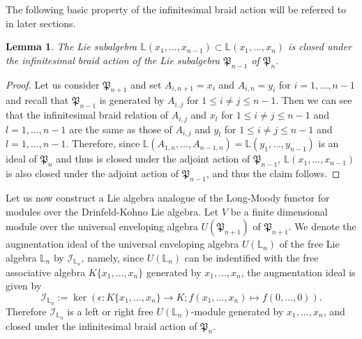 \documentclass[a4paper,12pt]{article}
\newtheorem{lem}[thm]{Lemma}
\theoremstyle{definition}
\theoremstyle{remark}
\begin{document}
The following basic property of the infinitesimal braid action will be referred to in later sections.
\begin{lem}\label{lem:minpurebraid}
	The Lie subalgebra $\mathbb{L}(x_{1},\ldots,x_{n-1})
	\subset \mathbb{L}(x_{1},\ldots,x_{n})$ 
	is closed under the infinitesimal braid action of 
	the Lie subalgebra $\mathfrak{P}_{n-1}$ of 
	$\mathfrak{P}_{n}$.
\end{lem} 
\begin{proof}
Let us consider $\mathfrak{P}_{n+1}$
and set $A_{i,n+1}=x_{i}$ and $A_{i,n}=y_{i}$ for $i=1,\ldots,n-1$
and recall that $\mathfrak{P}_{n-1}$ is generated by $A_{i,j}$ for $1\le i\neq j\le n-1$.
Then we can see that the infinitesimal braid relation of 
$A_{i,j}$ and $x_{l}$
for $1\le i\neq j\le n-1$ and $l=1,\ldots,n-1$
are the same as those of 
$A_{i,j}$ and $y_{l}$ for $1\le i\neq j\le n-1$ and $l=1,\ldots,n-1$.
Therefore, since $\mathbb{L}(A_{1,n},\ldots,A_{n-1,n})=\mathbb{L}(y_{1},\ldots,y_{n-1})$
is an ideal of $\mathfrak{P}_{n}$ and thus
is closed under the adjoint action of $\mathfrak{P}_{n-1}$,
$\mathbb{L}(x_{1},\ldots,x_{n-1})$
is also closed under the adjoint action of $\mathfrak{P}_{n-1}$, and thus the claim follows.
\end{proof}
Let us now construct a Lie algebra analogue of the Long-Moody functor for modules over the Drinfeld-Kohno Lie algebra.
Let $V$ be a finite dimensional module over the universal enveloping algebra $U(\mathfrak{P}_{n+1})$ of $\mathfrak{P}_{n+1}$.
We denote the augmentation ideal of 
the universal enveloping algebra $U(\mathbb{L}_{n})$ of the free Lie algebra $\mathbb{L}_{n}$
by $\mathcal{I}_{\mathbb{L}_{n}}$, namely,
since $U(\mathbb{L}_{n})$ can be indentified with the free associative algebra $K\{x_{1},\ldots,x_{n}\}$ generated by $x_{1},\ldots,x_{n}$,
the augmentation ideal is given by
\[
	\mathcal{I}_{\mathbb{L}_{n}}:= \ker\left(\epsilon\colon K\{x_{1},\ldots,x_{n}\}\to K; f(x_{1},\ldots,x_{n})\mapsto f(0,\ldots,0)\right).	
\]
Therefore $\mathcal{I}_{\mathbb{L}_{n}}$ is a left or right free $U(\mathbb{L}_{n})$-module
generated by $x_{1},\ldots,x_{n}$, and
closed under
the infinitesimal braid action of $\mathfrak{P}_{n}$.
\end{document}
